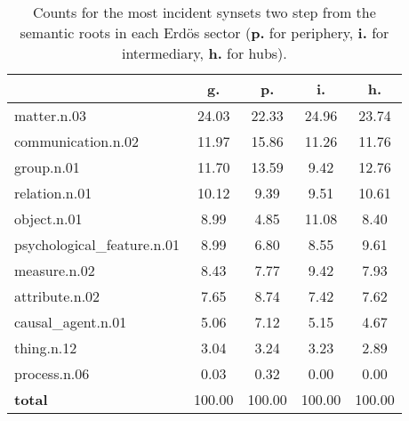 \begin{table}[h!]
\begin{center}
\begin{tabular}{| l || c | c | c | c |}\hline
 & {\bf g.} & {\bf p.} & {\bf i.} & {\bf h.} \\\hline\hline
matter.n.03 & 24.03  & 22.33  & 24.96  & 23.74 \\\hline
communication.n.02 & 11.97  & 15.86  & 11.26  & 11.76 \\\hline
group.n.01 & 11.70  & 13.59  & 9.42  & 12.76 \\\hline
relation.n.01 & 10.12  & 9.39  & 9.51  & 10.61 \\\hline
object.n.01 & 8.99  & 4.85  & 11.08  & 8.40 \\\hline
psychological\_feature.n.01 & 8.99  & 6.80  & 8.55  & 9.61 \\\hline
measure.n.02 & 8.43  & 7.77  & 9.42  & 7.93 \\\hline
attribute.n.02 & 7.65  & 8.74  & 7.42  & 7.62 \\\hline
causal\_agent.n.01 & 5.06  & 7.12  & 5.15  & 4.67 \\\hline
thing.n.12 & 3.04  & 3.24  & 3.23  & 2.89 \\\hline
process.n.06 & 0.03  & 0.32  & 0.00  & 0.00 \\\hline\hline
{{\bf total}} & 100.00  & 100.00  & 100.00  & 100.00 \\\hline
\end{tabular}
\caption{Counts for the most incident synsets two step from the semantic roots in each Erd\"os sector ({\bf p.} for periphery, {\bf i.} for intermediary, {\bf h.} for hubs).}
\end{center}
\end{table}